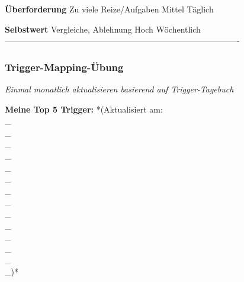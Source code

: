 \textbf{Überforderung}    Zu viele Reize/Aufgaben    Mittel             Täglich

\textbf{Selbstwert}       Vergleiche, Ablehnung      Hoch               Wöchentlich
-------------------------------------------------------------------------------------

\subsubsection{\textbf{\textcolor{ctmmRed}{Trigger}-Mapping-Übung}}

\textit{\textcolor{ctmmYellow}{\faLightbulb} Einmal monatlich aktualisieren basierend auf \textcolor{ctmmRed}{Trigger}-Tagebuch}

\textbf{Meine Top 5 \textcolor{ctmmRed}{Trigger}:} *(Aktualisiert am:
\\\_\\\_\\\_\\\_\\\_\\\_\\\_\\\_\\\_\\\_\\\_\\\_\\\_\\\_)*

